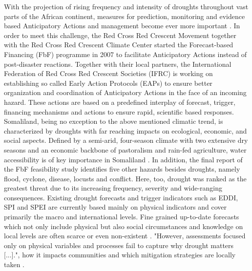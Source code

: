 With the projection of rising frequency and intensity of droughts throughout vast parts of the African continent, measures for prediction, monitoring and evidence based Anticipatory Actions and management become ever more important \autocite{abdulkadirAssessmentDroughtRecurrence2017,adelekanAfricaClimateChange2022,vereintenationenSpecialReportDrought2021}.\newline
In order to meet this challenge, the Red Cross Red Crescent Movement together with the Red Cross Red Crescent Climate Center started the Forecast-based Financing (FbF) programme in 2007 to facilitate Anticipatory Actions instead of post-disaster reactions. Together with their local partners, the International Federation of Red Cross Red Crescent Societies (IFRC) is working on establishing so called Early Action Protocols (EAPs) to ensure better organization and coordination of Anticipatory Actions in the face of an incoming hazard. These actions are based on a predefined interplay of forecast, trigger, financing mechanisms and actions to ensure rapid, scientific based responses.\newline
Somaliland, being no exception to the above mentioned climatic trend, is characterized by droughts with far reaching impacts on ecological, economic, and social aspects. Defined by a semi-arid, four-season climate with two extensive dry seasons and an economic backbone of pastoralism and rain-fed agriculture, water accessibility is of key importance in Somaliland \autocite{abdulkadirAssessmentDroughtRecurrence2017,petrucciLandscapeLandformsNorthern2022,republicofsomalilandSomalilandCountryProfile2021}. In addition, the final report of the FbF feasibility study identifies five other hazards besides droughts, namely flood, cyclone, disease, locusts and conflict. Here, too, drought was ranked as the greatest threat due to its increasing frequency, severity and wide-ranging consequences.\newline
Existing drought forecasts and trigger indicators such as EDDI, SPI and SPEI are currently based mainly on physical indicators and cover primarily the macro and international levels. Fine grained up-to-date forecasts which not only include physical but also social circumstances and knowledge on local levels are often scarce or even non-existent \autocite{poornimaDroughtPredictionBased2019,somaliredcrescentsocietyFeasibilityStudyPotential2022,SPEIGlobalDrought}. "However, assessments focused only on physical variables and processes fail to capture why drought matters [...]."\autocite[3]{lackstromBackyardHydroclimatologyCitizen2022}, how it impacts communities and which mitigation strategies are locally taken .\newline
